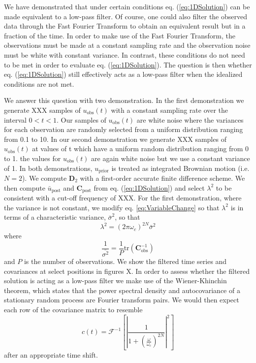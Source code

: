 \documentclass[10pt,a4paper]{article}
\begin{document}
We have demonstrated that under certain conditions eq. (\ref{eq:1DSolution}) can be made equivalent to a low-pass filter.  Of course, one could also filter the observed data through the Fast Fourier Transform to obtain an equivalent result but in a fraction of the time.  In order to make use of the Fast Fourier Transform, the observations must be made at a constant sampling rate and the observation noise must be  white with constant variance.  In contrast, these conditions do not need to be met in order to evaluate eq. (\ref{eq:1DSolution}).  The question is then whether eq. (\ref{eq:1DSolution}) still effectively acts as a low-pass filter when the idealized conditions are not met.  

We answer this question with two demonstration.  In the first demonstration we generate XXX samples of $u_\mathrm{obs}(t)$ with a constant sampling rate over the interval $0<t<1$.  Our samples of $u_\mathrm{obs}(t)$ are white noise where the variances for each observation are randomly selected from a uniform distribution ranging from 0.1 to 10.  In our second demonstration we generate XXX samples of $u_\mathrm{obs}(t)$ at values of t which have a uniform random distribution ranging from 0 to 1. the values for $u_\mathrm{obs}(t)$ are again white noise but we use a constant variance of 1.  In both demonstrations, $u_\mathrm{prior}$ is treated as integrated Brownian motion (i.e. $N=2$).  We compute $\mathbf{D}_2$ with a first-order accurate finite difference scheme. We then compute $\bar{u}_\mathrm{post}$ and $\mathbf{C}_\mathrm{post}$ from eq. (\ref{eq:1DSolution}) and select $\lambda^2$ to be consistent with a cut-off frequency of XXX.  For the first demonstration, where the variance is not constant, we modify eq. \ref{eq:VariableChange} so that $\lambda^2$ is in terms of a characteristic variance, $\bar{\sigma}^2$, so that
\begin{equation}
\lambda^2 = (2\pi\omega_c)^{2N}\bar{\sigma}^2
\end{equation}
where
\begin{equation}
\frac{1}{\bar{\sigma^2}} = \frac{1}{P} \mathrm{tr}\left(\mathbf{C}_\mathrm{obs}^{-1}\right)
\end{equation}
and $P$ is the number of observations.  We show the filtered time series and covariances at select positions in figures X.  In order to assess whether the filtered solution is acting as a low-pass filter we make use of the Wiener-Khinchin theorem, which states that the power spectral density and autocovariance of a stationary random process are Fourier transform pairs. We would then expect each row of the covariance matrix to resemble 
\begin{equation}
c(t) = \mathcal{F}^{-1}\left[ \left|\frac{1}{1 + \left(\frac{\omega}{\omega_c}\right)^{2N}}\right|^2\right]
\end{equation}
after an appropriate time shift.
\end{document}
